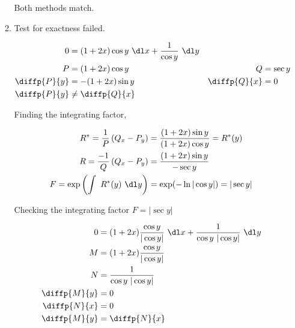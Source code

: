 \begin{enumerate}
\begin{enumerate}
                    Both methods match.

              \item Test for exactness failed.

                    \begin{align}
                        0            & = (1+2x) \cos y\ \dl x + \frac{1}{\cos y}
                        \ \dl y                                                    \\
                        P            & = (1+2x) \cos y                           &
                        Q            & = \sec y                                    \\
                        \diffp{P}{y} & = -(1+2x) \sin y                          &
                        \diffp{Q}{x} & = 0                                         \\
                        \diffp{P}{y} & \neq \diffp{Q}{x}
                    \end{align}

                    Finding the integrating factor,

                    \begin{align}
                        R^{*} = \frac{1}{P} \left( Q_{x} - P_{y} \right)
                         & = \frac{(1+2x) \sin y}{(1+2x) \cos y}    = R^{*}(y) \\
                        R = \frac{-1}{Q}\left( Q_{x} - P_{y} \right)
                         & = \frac{(1+2x) \sin y}{- \sec y}                    \\
                        F = \exp \left( \int\ R^{*}(y)\ \dl y\right)
                         & = \exp (-\ln |\cos y|) = | \sec y |
                    \end{align}

                    Checking the integrating factor $ F = | \sec y | $

                    \begin{align}
                        0            & = (1 +2x) \frac{\cos y}{|\cos y|}\ \dl x
                        + \frac{1}{\cos y\ |\cos y|} \ \dl y                    \\
                        M            & = (1 +2x) \frac{\cos y}{|\cos y|}        \\
                        N            & = \frac{1}{\cos y\ |\cos y|}             \\
                        \diffp{M}{y} & = 0                                      \\
                        \diffp{N}{x} & = 0                                      \\
                        \diffp{M}{y} & = \diffp{N}{x}
                    \end{align}


\end{enumerate}
\end{enumerate}
